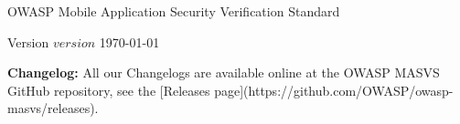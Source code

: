 \thispagestyle{empty} %

OWASP Mobile Application Security Verification Standard


Version $version$ \today

\textbf{Changelog:} All our Changelogs are available online at the OWASP MASVS GitHub repository, see the [Releases page](https://github.com/OWASP/owasp-masvs/releases).
